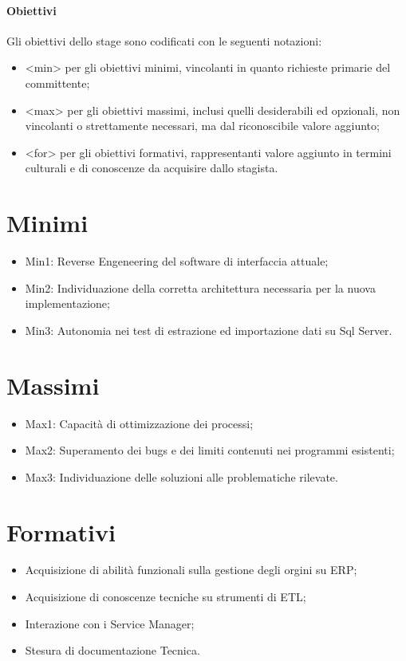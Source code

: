 
\subsubsection{Obiettivi}
Gli obiettivi dello stage sono codificati con le seguenti notazioni:
\begin{itemize}
\item <min> per gli obiettivi minimi, vincolanti in quanto richieste primarie del committente;
\item <max> per gli obiettivi massimi, inclusi quelli desiderabili ed opzionali, non vincolanti o strettamente necessari, ma dal riconoscibile valore aggiunto;
\item <for> per gli obiettivi formativi, rappresentanti valore aggiunto in termini culturali e di conoscenze da acquisire dallo stagista.
\end{itemize}

\chapter{Minimi}
\begin{itemize}
\item Min1: Reverse Engeneering del software di interfaccia attuale;
\item Min2: Individuazione della corretta architettura necessaria per la nuova implementazione;
\item Min3: Autonomia nei test di estrazione ed importazione dati su Sql Server.
\end{itemize}

\chapter{Massimi}
\begin{itemize}
\item Max1: Capacità di ottimizzazione dei processi;
\item Max2: Superamento dei bugs e dei limiti contenuti nei programmi esistenti;
\item Max3: Individuazione delle soluzioni alle problematiche rilevate.
\end{itemize}

\chapter{Formativi}
\begin{itemize}
\item Acquisizione di abilità funzionali sulla gestione degli orgini su ERP;
\item Acquisizione di conoscenze tecniche su strumenti di ETL;
\item Interazione con i Service Manager;
\item Stesura di documentazione Tecnica.
\end{itemize}